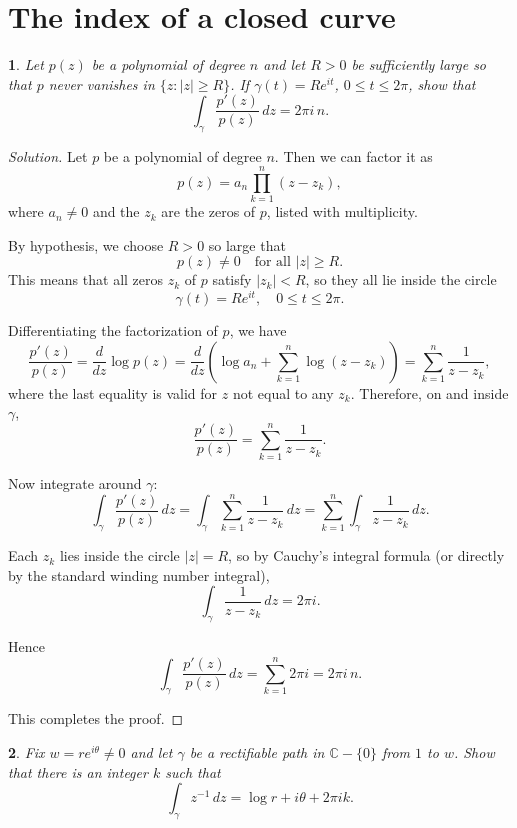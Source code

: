 \documentclass[12pt, a4paper]{report}
\theoremstyle{spaced}
\newtheorem{exercise}{}
\newcommand{\setexercise}[1]{\setcounter{exercise}{#1-1}}
\begin{document}
\section{The index of a closed curve}
\setexercise{3}
\begin{exercise}
	Let $p(z)$ be a polynomial of degree $n$ and let $R>0$ be sufficiently large so that
	$p$ never vanishes in $\{z : |z| \ge R\}$.
	If $\gamma(t)=Re^{it}$, $0\le t\le 2\pi$, show that
	\[
		\int_{\gamma} \frac{p'(z)}{p(z)}\,dz = 2\pi i\,n.
	\]
\end{exercise}
\begin{proof}[Solution]
	Let $p$ be a polynomial of degree $n$. Then we can factor it as
	\[
		p(z) = a_n \prod_{k=1}^n (z - z_k),
	\]
	where $a_n \neq 0$ and the $z_k$ are the zeros of $p$, listed with multiplicity.

	By hypothesis, we choose $R>0$ so large that
	\[
		p(z) \neq 0 \quad \text{for all } |z|\ge R.
	\]
	This means that all zeros $z_k$ of $p$ satisfy $|z_k| < R$, so they all lie inside the circle
	\[
		\gamma(t) = Re^{it}, \quad 0 \le t \le 2\pi.
	\]

	Differentiating the factorization of $p$, we have
	\[
		\frac{p'(z)}{p(z)}
		= \frac{d}{dz} \log p(z)
		= \frac{d}{dz} \left( \log a_n + \sum_{k=1}^n \log(z - z_k) \right)
		= \sum_{k=1}^n \frac{1}{z - z_k},
	\]
	where the last equality is valid for $z$ not equal to any $z_k$.
	Therefore, on and inside $\gamma$,
	\[
		\frac{p'(z)}{p(z)} = \sum_{k=1}^n \frac{1}{z - z_k}.
	\]

	Now integrate around $\gamma$:
	\[
		\int_{\gamma} \frac{p'(z)}{p(z)}\,dz
		= \int_{\gamma} \sum_{k=1}^n \frac{1}{z - z_k}\,dz
		= \sum_{k=1}^n \int_{\gamma} \frac{1}{z - z_k}\,dz.
	\]

	Each $z_k$ lies inside the circle $|z|=R$, so by Cauchy's integral formula (or directly by the standard winding number integral),
	\[
		\int_{\gamma} \frac{1}{z - z_k}\,dz = 2\pi i.
	\]

	Hence
	\[
		\int_{\gamma} \frac{p'(z)}{p(z)}\,dz
		= \sum_{k=1}^n 2\pi i
		= 2\pi i\, n.
	\]

	This completes the proof.
\end{proof}

\setexercise{4}
\begin{exercise}
	Fix $w = r e^{i\theta} \ne 0$ and let $\gamma$ be a rectifiable path in $\mathbb{C}-\{0\}$ from $1$ to $w$.
	Show that there is an integer $k$ such that
	\[
		\int_{\gamma} z^{-1}\,dz = \log r + i\theta + 2\pi i k.
	\]
\end{exercise}
\end{document}
